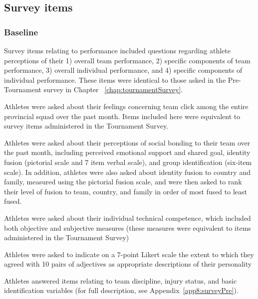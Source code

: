 \begin{CJK}{UTF8}{gbsn}
\subsection{Survey items\label{app9:surveyItems}}

\subsubsection{Baseline\label{app9:surveyItemsBaseline}}

Survey items relating to performance included questions regarding athlete perceptions of their 1) overall team performance, 2) specific components of team performance, 3) overall individual performance, and 4) specific components of individual performance.  These items were identical to those asked in the Pre-Tournament survey in Chapter ~\ref{chap:tournamentSurvey}.

Athletes were asked about their feelings concerning team click among the entire provincial squad over the past month. Items included here were equivalent to survey items administered in the Tournament Survey.


Athletes were asked about their perceptions of social bonding to their team over the past month, including perceived emotional support and shared goal, identity fusion (pictorial scale and 7 item verbal scale), and group identification (six-item scale). In addition, athletes were also asked about identity fusion to country and family, measured using the pictorial fusion scale, and were then asked to rank their level of fusion to team, country, and family in order of most fused to least fused.

Athletes were asked about their individual technical competence, which included both objective and subjective measures (these measures were equivalent to items administered in the Tournament Survey)

Athletes were asked to indicate on a 7-point Likert scale the extent to which they agreed with 10 pairs of adjectives as appropriate descriptions of their personality

Athletes answered items relating to team discipline, injury status, and basic identification variables (for full description, see Appendix~\ref{app8:surveyPre}).



\end{CJK}
